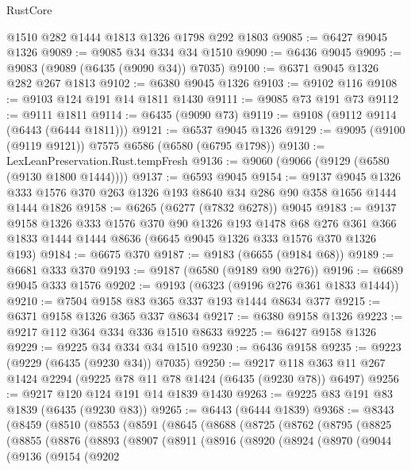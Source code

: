\begin{lexlean}{RustCore}
\begin{coremodule}
{\begin{coremodule}
{{{{{{{{{{{{{{{{{{{{{{{{{{{{{{{{{{{{{{{{{{{{{    @1510
    @282
    @1444
    @1813
    @1326
    @1798
    @292
    @1803
@9085 := @6427 @9045 @1326
@9089 := @9085 @34 @334 @34 @1510
@9090 := @6436 @9045
@9095 := @9083 (@9089 (@6435 (@9090 @34)) @7035)
@9100 := @6371 @9045 @1326 @282 @267 @1813
@9102 := @6380 @9045 @1326
@9103 := @9102 @116
@9108 := @9103 @124 @191 @14 @1811 @1430
@9111 := @9085 @73 @191 @73
@9112 := @9111 @1811
@9114 := @6435 (@9090 @73)
@9119 := @9108 (@9112 @9114 (@6443 (@6444 @1811)))
@9121 := @6537 @9045 @1326
@9129 := @9095 (@9100 (@9119 @9121)) @7575 @6586 (@6580 (@6795 @1798))
@9130 := LexLeanPreservation.Rust.tempFresh
@9136 := @9060 (@9066 (@9129 (@6580 (@9130 @1800 @1444))))
@9137 := @6593 @9045
@9154 := @9137
    @9045
    @1326
    @333
    @1576
    @370
    @263
    @1326
    @193
    @8640
    @34
    @286
    @90
    @358
    @1656
    @1444
    @1444
    @1826
@9158 := @6265 (@6277 (@7832 @6278)) @9045
@9183 := @9137
    @9158
    @1326
    @333
    @1576
    @370
    @90
    @1326
    @193
    @1478
    @68
    @276
    @361
    @366
    @1833
    @1444
    @1444
    @8636
    (@6645 @9045 @1326 @333 @1576 @370 @1326 @193)
@9184 := @6675 @370
@9187 := @9183 (@6655 (@9184 @68))
@9189 := @6681 @333 @370
@9193 := @9187 (@6580 (@9189 @90 @276))
@9196 := @6689 @9045 @333 @1576
@9202 := @9193 (@6323 (@9196 @276 @361 @1833 @1444))
@9210 := @7504 @9158 @83 @365 @337 @193 @1444 @8634 @377
@9215 := @6371 @9158 @1326 @365 @337 @8634
@9217 := @6380 @9158 @1326
@9223 := @9217 @112 @364 @334 @336 @1510 @8633
@9225 := @6427 @9158 @1326
@9229 := @9225 @34 @334 @34 @1510
@9230 := @6436 @9158
@9235 := @9223 (@9229 (@6435 (@9230 @34)) @7035)
@9250 := @9217 @118 @363 @11 @267 @1424 @2294 (@9225 @78 @11 @78 @1424 (@6435 (@9230 @78)) @6497)
@9256 := @9217 @120 @124 @191 @14 @1839 @1430
@9263 := @9225 @83 @191 @83 @1839 (@6435 (@9230 @83))
@9265 := @6443 (@6444 @1839)
@9368 := @8343
    (@8459
      (@8510
        (@8553
          (@8591
            (@8645
              (@8688
                (@8725
                  (@8762
                    (@8795
                      (@8825
                        (@8855
                          (@8876
                            (@8893
                              (@8907
                                (@8911
                                  (@8916
                                    (@8920
                                      (@8924
                                        (@8970
                                          (@9044
                                            (@9136
                                              (@9154
                                                (@9202
}}}}}}}}}}}}}}}}}}}}}}}}}}}}}}}}}}}}}}}}}}}}}
\end{coremodule}}
\end{coremodule}
\end{lexlean}
